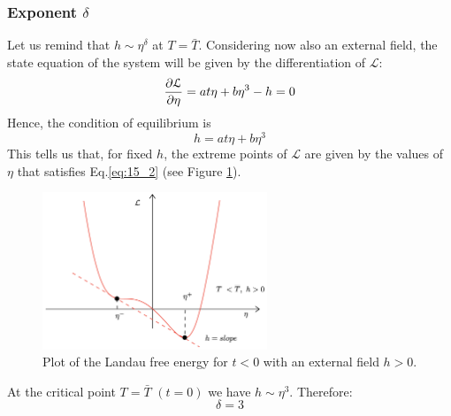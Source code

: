 \documentclass[../main/main.tex]{subfiles}
\begin{document}
\subsubsection{Exponent \( \delta  \)}
Let us remind that \( h \sim \eta ^ \delta  \) at \( T = \bar{T}  \).
Considering now also an external field, the state equation of the system will be given by the differentiation of \( \mathcal{L} \):
\begin{equation*}
  \pdv{\mathcal{L}}{\eta } = a t \eta + b \eta ^3 - h = 0
\end{equation*}
Hence, the condition of equilibrium is
\begin{equation}
  h = a t \eta + b \eta ^3
  \label{eq:15_2}
\end{equation}
This tells us that, for fixed \( h \), the extreme points of \( \mathcal{L} \) are given by the values of \( \eta  \) that satisfies Eq.\eqref{eq:15_2} (see Figure \ref{fig:15_14}).

\begin{figure}[h!]
\centering
\includegraphics[width=0.6\textwidth]{../lessons/15_image/15.jpg}
\caption{\label{fig:15_14} Plot of the Landau free energy for \( t<0 \) with an external field \( h>0 \).}
\end{figure}
At the critical point \( T= \bar{T}  \) \( (t=0) \) we have \( h \sim \eta ^3 \). Therefore:
\begin{equation*}
  \delta =3
\end{equation*}
\end{document}
